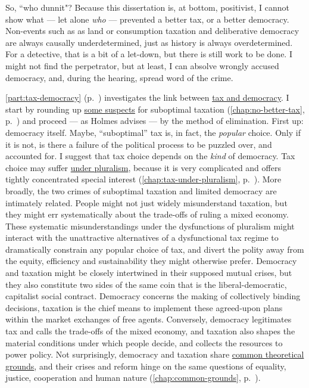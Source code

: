 So, ``who dunnit"?
Because this dissertation is, at bottom, positivist, I cannot show what --- let alone \emph{who} --- prevented a better tax, or a better democracy.
Non-events such as as land or consumption taxation and deliberative democracy are always causally underdetermined, just as history is always overdetermined.
For a detective, that is a bit of a let-down, but there is still work to be done.
I might not find the perpetrator, but at least, I can absolve wrongly accused democracy, and, during the hearing, spread word of  the crime.

\autoref{part:tax-democracy} (p.~\pageref{part:tax-democracy}) investigates the link between \hyperref[part:tax-democracy]{tax and democracy}.
I start by rounding up \hyperref[chap:no-better-tax]{some suspects} for suboptimal taxation (\autoref{chap:no-better-tax}, p.~\pageref{chap:no-better-tax}) and proceed --- as Holmes advises --- by the method of elimination.
First up:
democracy itself.
Maybe, ``suboptimal'' tax is, in fact, the \emph{popular} choice.
Only if it is not, is there a failure of the political process to be puzzled over, and accounted for.
I suggest that tax choice depends on the \emph{kind} of democracy.
Tax choice may suffer \hyperref[chap:tax-under-pluralism]{under pluralism}, because it is very complicated and offers tightly concentrated special interest (\autoref{chap:tax-under-pluralism}, p.~\pageref{chap:tax-under-pluralism}).
More broadly, the two crimes of suboptimal taxation and limited democracy are intimately related.
People might not just widely misunderstand taxation, but they might err systematically about the trade-offs of ruling a mixed economy.
These systematic misunderstandings under the dysfunctions of pluralism might interact with the unattractive alternatives of a dysfunctional tax regime to dramatically constrain any popular choice of tax, and divert the polity away from the equity, efficiency and sustainability they might otherwise prefer.
Democracy and taxation might be closely intertwined in their supposed mutual crises, but they also constitute two sides of the same coin that is the liberal-democratic, capitalist social contract.
Democracy concerns the making of collectively binding decisions, taxation is the chief means to implement these agreed-upon plans within the market exchanges of free agents.
Conversely, democracy legitimates tax and calls the trade-offs of the mixed economy, and taxation also shapes the material conditions under which people decide, and collects the resources to power policy.
Not surprisingly, democracy and taxation share \hyperref[chap:common-grounds]{common theoretical grounds}, and their crises and reform hinge on the same questions of equality, justice, cooperation and human nature (\autoref{chap:common-grounds}, p.~\pageref{chap:common-grounds}).

